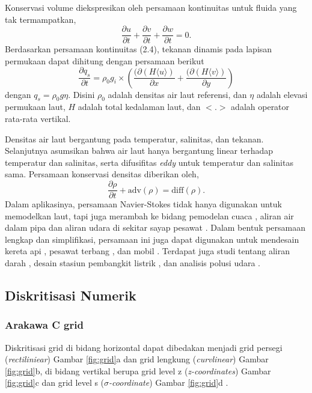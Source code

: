 \begin{spacing}{1.5}
	Konservasi volume diekspresikan oleh persamaan kontinuitas untuk fluida yang tak termampatkan,
	\begin{equation}
		\frac{\partial u}{\partial t} + \frac{\partial v}{\partial t} + \frac{\partial w}{\partial t} = 0.
	\end{equation}
	Berdasarkan persamaan kontinuitas (2.4), tekanan dinamis pada lapisan permukaan dapat dihitung dengan persamaan berikut
	\begin{equation}
		\frac{\partial q_s}{\partial t} = \rho_0 g_i \times \left( \frac{(\partial \left(H \langle u \rangle \right)} {\partial x} + \frac{(\partial \left(H \langle v \rangle \right)} {\partial y}\right)
	\end{equation}
	dengan $q_s = \rho_0 g \eta$. Disini $\rho_0$ adalah densitas air laut referensi, dan $\eta$ adalah elevasi permukaan laut, $H$ adalah total kedalaman laut, dan $<.>$ adalah operator rata-rata vertikal.
	\par Densitas air laut bergantung pada temperatur, salinitas, dan tekanan. Selanjutnya asumsikan bahwa air laut hanya bergantung linear terhadap temperatur dan salinitas, serta difusifitas \textit{eddy} untuk temperatur dan salinitas sama. Persamaan konservasi densitas diberikan oleh,
	\begin{equation}
		\frac{\partial \rho}{\partial t} + \text{adv}(\rho) = \text{diff}(\rho).
	\end{equation}
	Dalam aplikasinya, persamaan Navier-Stokes tidak hanya digunakan untuk memodelkan laut, tapi juga merambah ke bidang pemodelan cuaca , aliran air dalam pipa  dan aliran udara di sekitar sayap pesawat . Dalam bentuk persamaan lengkap dan simplifikasi, persamaan ini juga dapat digunakan untuk mendesain kereta api , pesawat terbang , dan mobil . Terdapat juga studi tentang aliran darah , desain stasiun pembangkit listrik , dan analisis polusi udara . 

\subsection[Diskritisasi Numerik]{Diskritisasi Numerik}
\subsubsection[Arakawa C grid]{Arakawa C grid}
	Diskritisasi grid di bidang horizontal dapat dibedakan menjadi grid persegi (\textit{rectiliniear}) Gambar \ref{fig:grid}a dan grid lengkung (\textit{curvlinear}) Gambar \ref{fig:grid}b, di bidang vertikal berupa grid level z (\textit{z-coordinates}) Gambar \ref{fig:grid}c dan grid level s (\textit{$\sigma$-coordinate}) Gambar \ref{fig:grid}d .
	

\end{spacing}
